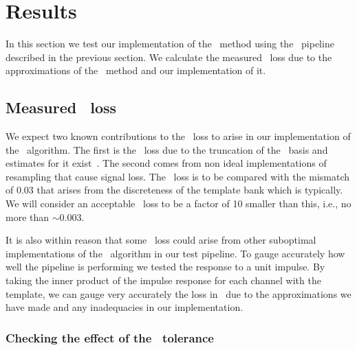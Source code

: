 \section{Results}
\label{SECIV}\label{sec:results}

In this section we test our implementation of the \lloid\ method using the \gstreamer\
pipeline described in the previous section.  We calculate the measured \SNR\
loss due to the approximations of the \lloid\ method and our implementation of
it.
%
%
%


\subsection{Measured \SNR\ loss}

We expect two known contributions to the \SNR\ loss to arise in our
implementation of the \lloid\ algorithm.  The first is the \SNR\ loss due to
the truncation of the \SVD\ basis and estimates for it
exist~\cite{Cannon:2010p10398}.  The second comes from non ideal
implementations of resampling that cause signal loss.  The \SNR\ loss is to be compared
with the mismatch of 0.03 that arises from the discreteness of the
template bank which is typically.  We will consider an acceptable
\SNR\ loss to be a factor of 10 smaller than this, i.e., no more than $\sim 0.003$.

It is also within reason that some \SNR\ loss could arise from other suboptimal
implementations of the \lloid\ algorithm in our test pipeline.  To gauge
accurately how well the pipeline is performing we tested the response to a
unit impulse.  By taking the inner product of the impulse response for each channel
with the template, we can gauge very accurately the loss in
\SNR\ due to the approximations we have made and any inadequacies in
our implementation.

\subsubsection{Checking the effect of the \SVD\ tolerance}

